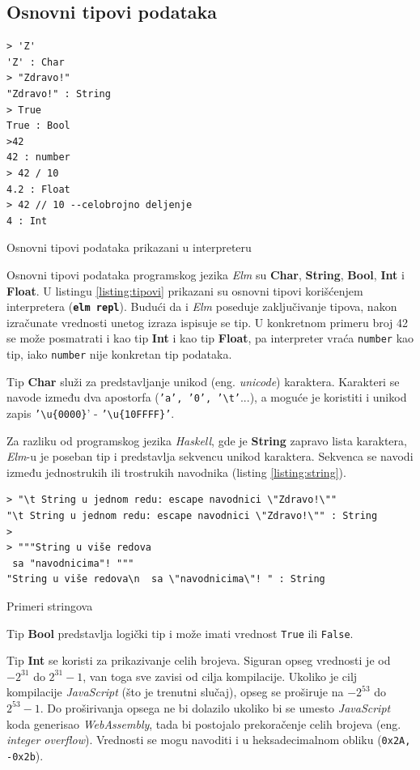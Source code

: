 \documentclass[12pt,oneside]{memoir}
\begin{document}
\subsection{Osnovni tipovi podataka}
\begin{listing}[h]
\begin{verbatim}
> 'Z'
'Z' : Char
> "Zdravo!"
"Zdravo!" : String
> True
True : Bool
>42
42 : number
> 42 / 10 
4.2 : Float
> 42 // 10 --celobrojno deljenje
4 : Int
\end{verbatim}
\caption{Osnovni tipovi podataka prikazani u interpreteru}
\label{listing:tipovi}
\end{listing}
Osnovni tipovi podataka programskog jezika \emph{Elm} su \textbf{Char}, \textbf{String}, \textbf{Bool},
\textbf{Int} i \textbf{Float}. U listingu \ref{listing:tipovi} prikazani su osnovni
tipovi korišćenjem interpretera (\texttt{\textbf{elm repl}}). Budući da i \emph{Elm} poseduje zaključivanje tipova, nakon
izračunate vrednosti unetog izraza ispisuje se tip. U konkretnom primeru broj 42 se
može posmatrati i kao tip \textbf{Int} i kao tip \textbf{Float}, pa interpreter vraća
\texttt{number} kao tip, iako \texttt{number} nije konkretan tip podataka.


Tip \textbf{Char} služi za predstavljanje unikod (eng. \emph{unicode}) karaktera.
Karakteri se navode između dva apostorfa (\texttt{'a', '0', '\textbackslash t'}...), a
moguće je koristiti i unikod zapis  \texttt{'\textbackslash u\{0000\}}' -
\texttt{'\textbackslash u\{10FFFF\}'}.

Za razliku od programskog jezika \emph{Haskell}, gde je \textbf{String} zapravo lista karaktera, \emph{Elm}-u je
poseban tip i predstavlja sekvencu unikod karaktera. Sekvenca se navodi između
jednostrukih ili trostrukih navodnika (listing \ref{listing:string}).

\begin{listing}[ht]
\begin{verbatim}
> "\t String u jednom redu: escape navodnici \"Zdravo!\""
"\t String u jednom redu: escape navodnici \"Zdravo!\"" : String
>
> """String u više redova
 sa "navodnicima"! """
"String u više redova\n  sa \"navodnicima\"! " : String
\end{verbatim}
\caption{Primeri stringova}
\label{listing:string}
\end{listing}

Tip \textbf{Bool} predstavlja logički tip i može imati vrednost \texttt{True} ili
\texttt{False}. 

Tip \textbf{Int} se koristi za prikazivanje celih brojeva. Siguran opseg vrednosti je
od \(-2^{31}\) do \(2^{31} - 1\), van toga sve zavisi od cilja kompilacije. Ukoliko je
cilj kompilacije \emph{JavaScript} (što je trenutni slučaj), opseg se proširuje na \(-2^{53}\) do
\(2^{53} - 1\). Do proširivanja opsega ne bi dolazilo ukoliko bi se
umesto \emph{JavaScript} koda generisao \emph{WebAssembly}, tada bi postojalo prekoračenje celih
brojeva (eng. \emph{integer overflow}). Vrednosti se mogu navoditi i u heksadecimalnom
obliku (\texttt{0x2A, -0x2b}).
\end{document}

